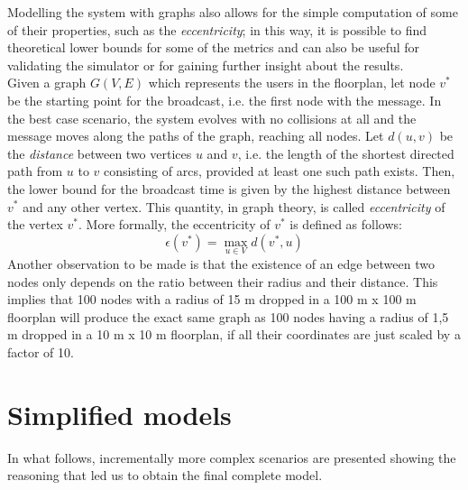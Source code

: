 Modelling the system with graphs also allows for the simple computation of some of their properties, such as the \textit{eccentricity}; in this way, it is possible to find theoretical lower bounds for some of the metrics and can also be useful for validating the simulator or for gaining further insight about the results.\\
Given a graph $G(V, E)$ which represents the users
in the floorplan, let node $v^{*}$ be the starting point for the broadcast, i.e.
the first node with the message. In the best case scenario, the system evolves
with no collisions at all and the message moves along the paths of the graph,
reaching all nodes. Let $d(u, v)$ be the \textit{distance} between two vertices
$u$ and $v$, i.e. the length of the shortest directed path from $u$ to $v$
consisting of arcs, provided at least one such path exists. Then, the lower
bound for the broadcast time is given by the highest distance between $v^{*}$
and any other vertex. This quantity, in graph theory, is called
\textit{eccentricity} of the vertex $v^{*}$. More formally, the eccentricity of
$v^{*}$ is defined as follows:
\begin{equation}
\epsilon(v^{*}) = \max_{u{\in}V} d(v^{*}, u)
\end{equation}
Another observation to be made is that the existence of an edge between two nodes only depends on the ratio between their radius and their distance. This implies that 100 nodes with a radius of 15 m dropped in a 100 m x 100 m floorplan will produce the exact same graph as 100 nodes having a radius of 1,5 m dropped in a 10 m x 10 m floorplan, if all their coordinates are just scaled by a factor of 10.\\ 
\section{Simplified models}
In what follows, incrementally more complex scenarios are presented showing the
reasoning that led us to obtain the final complete model.
